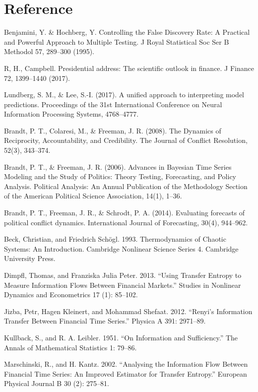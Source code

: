 \documentclass[
]{article}
\begin{document}
\hypertarget{reference}{%
\section{Reference}\label{reference}}

Benjamini, Y. \& Hochberg, Y. Controlling the False Discovery Rate: A
Practical and Powerful Approach to Multiple Testing. J Royal Statistical
Soc Ser B Methodol 57, 289--300 (1995).

R, H., Campbell. Presidential address: The scientific outlook in
finance. J Finance 72, 1399--1440 (2017).

Lundberg, S. M., \& Lee, S.-I. (2017). A unified approach to
interpreting model predictions. Proceedings of the 31st International
Conference on Neural Information Processing Systems, 4768--4777.

Brandt, P. T., Colaresi, M., \& Freeman, J. R. (2008). The Dynamics of
Reciprocity, Accountability, and Credibility. The Journal of Conflict
Resolution, 52(3), 343--374.

Brandt, P. T., \& Freeman, J. R. (2006). Advances in Bayesian Time
Series Modeling and the Study of Politics: Theory Testing, Forecasting,
and Policy Analysis. Political Analysis: An Annual Publication of the
Methodology Section of the American Political Science Association,
14(1), 1--36.

Brandt, P. T., Freeman, J. R., \& Schrodt, P. A. (2014). Evaluating
forecasts of political conflict dynamics. International Journal of
Forecasting, 30(4), 944--962.

Beck, Christian, and Friedrich Schögl. 1993. Thermodynamics of Chaotic
Systems: An Introduction. Cambridge Nonlinear Science Series 4.
Cambridge University Press.

Dimpfl, Thomas, and Franziska Julia Peter. 2013. ``Using Transfer
Entropy to Measure Information Flows Between Financial Markets.''
Studies in Nonlinear Dynamics and Econometrics 17 (1): 85--102.

Jizba, Petr, Hagen Kleinert, and Mohammad Shefaat. 2012. ``Renyi's
Information Transfer Between Financial Time Series.'' Physica A 391:
2971--89.

Kullback, S., and R. A. Leibler. 1951. ``On Information and
Sufficiency.'' The Annals of Mathematical Statistics 1: 79--86.

Marschinski, R., and H. Kantz. 2002. ``Analysing the Information Flow
Between Financial Time Series: An Improved Estimator for Transfer
Entropy.'' European Physical Journal B 30 (2): 275--81.
\end{document}
